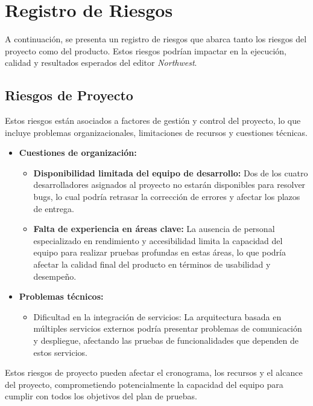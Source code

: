 \documentclass[stu, 12pt, letterpaper, donotrepeattitle, floatsintext, natbib]{apa7}
\begin{document}
\section{\large Registro de Riesgos}

\noindent A continuación, se presenta un registro de riesgos que abarca tanto los riesgos del proyecto como del producto. Estos riesgos podrían impactar en la ejecución, calidad y resultados esperados del editor \textit{Northwest}. 

\subsection{Riesgos de Proyecto}
Estos riesgos están asociados a factores de gestión y control del proyecto, lo que incluye problemas organizacionales, limitaciones de recursos y cuestiones técnicas.

\begin{itemize}
    \item \textbf{Cuestiones de organización:}
    \begin{itemize}
        \item \textbf{Disponibilidad limitada del equipo de desarrollo:} Dos de los cuatro desarrolladores asignados al proyecto no estarán disponibles para resolver bugs, lo cual podría retrasar la corrección de errores y afectar los plazos de entrega.
        \item \textbf{Falta de experiencia en áreas clave:} La ausencia de personal especializado en rendimiento y accesibilidad limita la capacidad del equipo para realizar pruebas profundas en estas áreas, lo que podría afectar la calidad final del producto en términos de usabilidad y desempeño.
    \end{itemize}

    \item \textbf{Problemas técnicos:}
    \begin{itemize}
        \item Dificultad en la integración de servicios: La arquitectura basada en múltiples servicios externos podría presentar problemas de comunicación y despliegue, afectando las pruebas de funcionalidades que dependen de estos servicios.
    \end{itemize}
\end{itemize}

\noindent Estos riesgos de proyecto pueden afectar el cronograma, los recursos y el alcance del proyecto, comprometiendo potencialmente la capacidad del equipo para cumplir con todos los objetivos del plan de pruebas.
\end{document}
